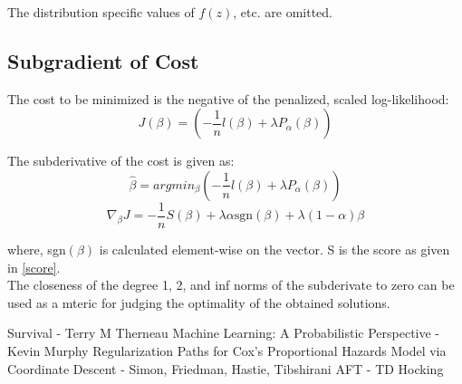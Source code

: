 \documentclass[12pt,a4paper]{report}
\begin{document}
The distribution specific values of $f(z)$, etc. are omitted.

\clearpage
\subsection*{Subgradient of Cost}
The cost to be minimized is the negative of the penalized, scaled log-likelihood:
\begin{equation} \label{cost}
  J(\beta) =  \left(-\frac{1}{n} l(\beta) + \lambda P_{\alpha}(\beta) \right)
\end{equation}

The subderivative of the cost is given as:
\begin{equation}
  \hat \beta = argmin_{\beta} \left(-\frac{1}{n} l(\beta) + \lambda P_{\alpha}(\beta) \right)
\end{equation}
\begin{equation} \label{subgrad_cost}
\nabla_{\beta} J = -\frac{1}{n} S(\beta) + \lambda \alpha \mbox{sgn}(\beta) 
                                       + \lambda (1-\alpha) \beta
\end{equation}

where, sgn$(\beta)$ is calculated element-wise on the vector. S is the score as given in \ref{score}. \\

\vspace{4mm}
The closeness of the degree 1, 2, and inf norms of the subderivate to zero can be used as a mteric for judging the optimality of the obtained solutions.

\begin{thebibliography}{1}
 Survival - Terry M Therneau
 Machine Learning: A Probabilistic Perspective - Kevin Murphy
 Regularization Paths for Cox's Proportional Hazards Model via Coordinate Descent - Simon, Friedman, Hastie, Tibshirani
 AFT - TD Hocking
\end{thebibliography}
\end{document}
